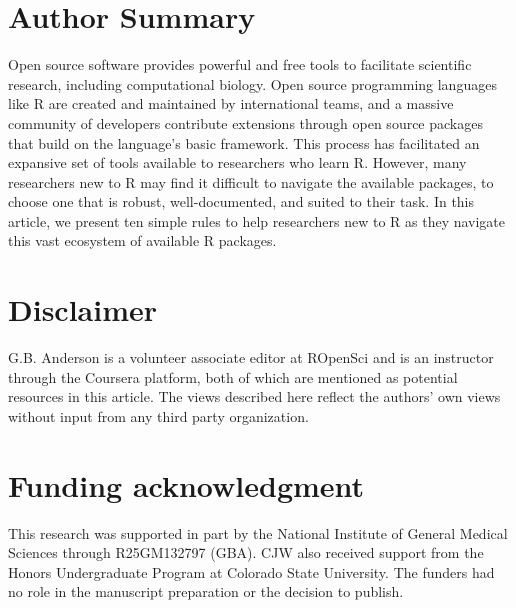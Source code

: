 \documentclass[10pt,letterpaper]{article}
\begin{document}

\linenumbers

\hypertarget{author-summary}{%
\section{Author Summary}\label{author-summary}}

Open source software provides powerful and free tools to facilitate
scientific research, including computational biology. Open source
programming languages like R are created and maintained by international
teams, and a massive community of developers contribute extensions
through open source packages that build on the language's basic
framework. This process has facilitated an expansive set of tools
available to researchers who learn R. However, many researchers new to R
may find it difficult to navigate the available packages, to choose one
that is robust, well-documented, and suited to their task. In this
article, we present ten simple rules to help researchers new to R as
they navigate this vast ecosystem of available R packages.

\hypertarget{disclaimer}{%
\section{Disclaimer}\label{disclaimer}}

G.B. Anderson is a volunteer associate editor at ROpenSci and is an
instructor through the Coursera platform, both of which are mentioned as
potential resources in this article. The views described here reflect
the authors' own views without input from any third party organization.

\hypertarget{funding-acknowledgment}{%
\section{Funding acknowledgment}\label{funding-acknowledgment}}

This research was supported in part by the National Institute of General
Medical Sciences through R25GM132797 (GBA). CJW also received support
from the Honors Undergraduate Program at Colorado State University. The
funders had no role in the manuscript preparation or the decision to
publish.
\end{document}
